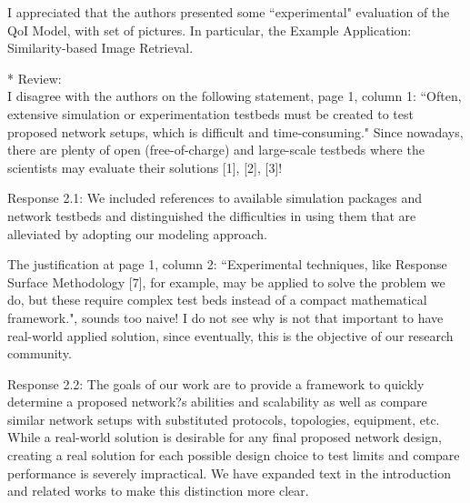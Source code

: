\documentclass[12pt, letterpaper, onecolumn]{IEEEtran}
\begin{document}
I appreciated that the authors presented some ``experimental" evaluation of the QoI Model, with set of pictures. In particular, the Example Application: Similarity-based Image Retrieval.

\noindent** Review: \\
I disagree with the authors on the following statement, page 1, column 1: ``Often, extensive simulation or experimentation testbeds must be created to test proposed network setups, which is difficult and time-consuming." Since nowadays, there are plenty of open (free-of-charge) and large-scale testbeds where the scientists may evaluate their solutions [1], [2], [3]! 

{\color{blue}
Response 2.1: We included references to available simulation packages and network testbeds and distinguished the difficulties in using them that are alleviated by adopting our modeling approach.
}

The justification at page 1, column 2: ``Experimental techniques, like Response Surface Methodology [7], for example, may be applied to solve the problem we do, but these require complex test beds instead of a compact mathematical framework.", sounds too naive! I do not see why is not that important to have real-world applied solution, since eventually, this is the objective of our research community. 

{\color{blue}
Response 2.2: The goals of our work are to provide a framework to quickly determine a proposed network?s abilities and scalability as well as compare similar network setups with substituted protocols, topologies, equipment, etc. While a real-world solution is desirable for any final proposed network design, creating a real solution for each possible design choice to test limits and compare performance is severely impractical. We have expanded text in the introduction and related works to make this distinction more clear.
}
\end{document}
